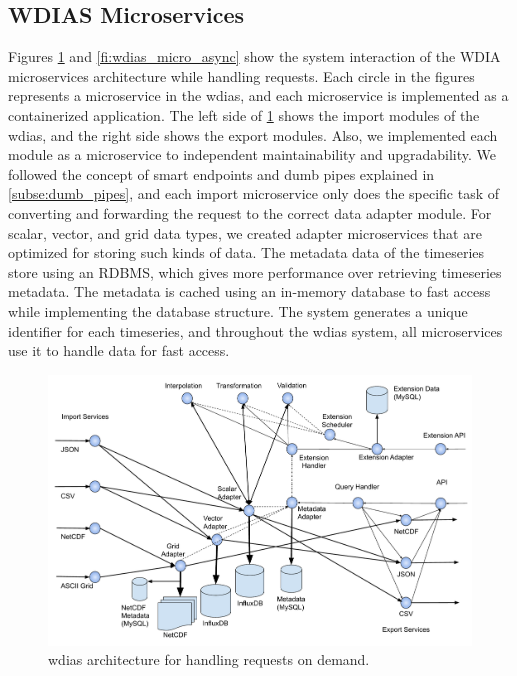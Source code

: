 \subsection{WDIAS Microservices}
\label{sebse:wdias_microservices}

Figures \ref{fi:wdias_micro_on_demand} and \ref{fi:wdias_micro_async} show the system interaction of the WDIA microservices architecture while handling requests. Each circle in the figures represents a microservice in the \acrshort{wdias}, and each microservice is implemented as a containerized application. The left side of \cref{fi:wdias_micro_on_demand} shows the import modules of the \acrshort{wdias}, and the right side shows the export modules. Also, we implemented each module as a microservice to independent maintainability and upgradability. We followed the concept of smart endpoints and dumb pipes explained in \cref{subse:dumb_pipes}, and each import microservice only does the specific task of converting and forwarding the request to the correct data adapter module. For scalar, vector, and grid data types, we created adapter microservices that are optimized for storing such kinds of data. The metadata data of the timeseries store using an RDBMS, which gives more performance over retrieving timeseries metadata. The metadata is cached using an in-memory database to fast access while implementing the database structure. The system generates a unique identifier for each timeseries, and throughout the \acrshort{wdias} system, all microservices use it to handle data for fast access.

\begin{figure}[htp]
    \centering
    \includegraphics[width=1\textwidth]{method/microservice/microservice_architecture-handle_on_demand-v4.pdf}
    \caption{\acrshort{wdias} architecture for handling requests on demand.}
    \label{fi:wdias_micro_on_demand}
\end{figure}

